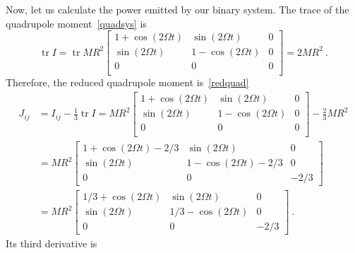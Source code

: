\documentclass[a4paper]{article}
\DeclareMathOperator{\tr}{tr}
\begin{document}
    Now, let us calculate the power emitted by our binary system. The trace of the quadrupole moment~\eqref{quadsys} is 
    \begin{equation*}
        \tr I = \tr MR^2 \begin{bmatrix}
            1 + \cos (2 \Omega t) & \sin (2 \Omega t) & 0 \\
            \sin (2 \Omega t) & 1 - \cos (2 \Omega t) & 0 \\
            0 & 0 & 0 \\
        \end{bmatrix} = 2 MR^2 ~.
    \end{equation*}
    Therefore, the reduced quadrupole moment is~\eqref{redquad}
    \begin{equation*}
    \begin{aligned}
        J_{ij} & = I_{ij} - \frac{1}{3} \tr I = MR^2 \begin{bmatrix}
            1 + \cos (2 \Omega t) & \sin (2 \Omega t) & 0 \\
            \sin (2 \Omega t) & 1 - \cos (2 \Omega t) & 0 \\
            0 & 0 & 0 \\
        \end{bmatrix}  - \frac{2}{3} M R^2 \\ & = MR^2 \begin{bmatrix}
            1 + \cos (2 \Omega t) - 2 / 3 & \sin (2 \Omega t) & 0 \\
            \sin (2 \Omega t) & 1 - \cos(2 \Omega t) - 2/3 & 0 \\
            0 & 0 & -2 /3
        \end{bmatrix} \\ & = MR^2 \begin{bmatrix}
            1 / 3 + \cos (2 \Omega t) & \sin (2 \Omega t) & 0 \\
            \sin (2 \Omega t) & 1 / 3 - \cos(2 \Omega t) & 0 \\
            0 & 0 & -2 / 3
        \end{bmatrix} ~.
    \end{aligned}
    \end{equation*}
    Its third derivative is 
\end{document}
